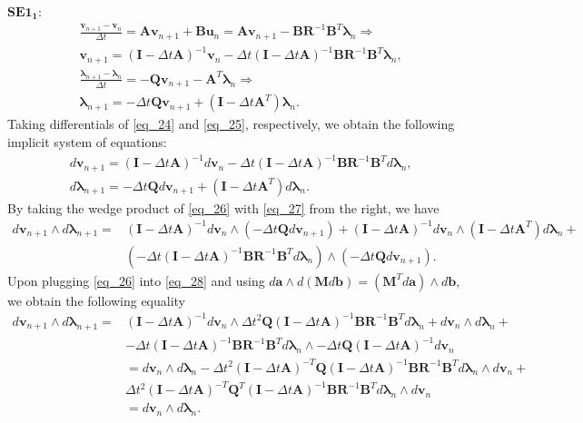 \documentclass[a4paper, 10pt]{article}
\newcommand{\SEoo}{SE1_1}
\begin{document}
$\bm{\SEoo:}$
\begin{align}
&   \frac{\bm{v}_{n+1} - \bm{v}_n}{\Delta{t}} = \bm{A}\bm{v}_{n+1} + \bm{B}\bm{u}_{n} =  \bm{A}\bm{v}_{n+1} - \bm{B}\bm{R}^{-1}\bm{B}^{T}\bm{\lambda}_{n} \Rightarrow \nonumber \\ &
    \bm{v}_{n+1} = (\bm{I} - \Delta{t}\bm{A})^{-1} \bm{v}_{n} - \Delta{t}(\bm{I} - \Delta{t}\bm{A})^{-1}\bm{B}\bm{R}^{-1}\bm{B}^{T}\bm{\lambda}_{n}, \label{eq_24} \\ &
       \frac{\bm{\lambda}_{n+1} - \bm{\lambda}_n}{\Delta{t}} = -\bm{Q}\bm{v}_{n+1} - \bm{A}^{T}\bm{\lambda}_{n} \Rightarrow \nonumber \\ &
       \bm{\lambda}_{n+1} = -\Delta{t}\bm{Q}\bm{v}_{n+1} +(\bm{I} - \Delta{t}\bm{A}^{T})\bm{\lambda}_{n}. \label{eq_25}
\end{align}
Taking differentials of \eqref{eq_24} and \eqref{eq_25}, respectively, we obtain the following implicit system of equations:
\begin{align}
    &  d\bm{v}_{n+1} = (\bm{I} - \Delta{t}\bm{A})^{-1} d\bm{v}_{n} - \Delta{t}(\bm{I} - \Delta{t}\bm{A})^{-1}\bm{B}\bm{R}^{-1}\bm{B}^{T}d\bm{\lambda}_{n}, \label{eq_26} \\
    & d\bm{\lambda}_{n+1} = -\Delta{t}\bm{Q}d\bm{v}_{n+1} +(\bm{I} - \Delta{t}\bm{A}^{T})d\bm{\lambda}_{n}. \label{eq_27}
\end{align}
By taking the wedge product of \eqref{eq_26} with \eqref{eq_27} from the right, we have
\begin{align}
       d\bm{v}_{n+1} \wedge   d\bm{\lambda}_{n+1}  = &  (\bm{I} - \Delta{t}\bm{A})^{-1} d\bm{v}_{n} \wedge  \left(-\Delta{t}\bm{Q}d\bm{v}_{n+1}\right) +   (\bm{I} - \Delta{t}\bm{A})^{-1} d\bm{v}_{n} \wedge (\bm{I} - \Delta{t}\bm{A}^{T})d\bm{\lambda}_{n}  +  \nonumber \\ &
          \left(-\Delta{t}(\bm{I} - \Delta{t}\bm{A})^{-1}\bm{B}\bm{R}^{-1}\bm{B}^{T}d\bm{\lambda}_{n}\right) \wedge \left(-\Delta{t}\bm{Q}d\bm{v}_{n+1} \right). \label{eq_28}
\end{align}
Upon plugging \eqref{eq_26} into \eqref{eq_28} and using $d\bm{a} \wedge d(\bm{M}d\bm{b}) = (\bm{M}^{T}d\bm{a}) \wedge d\bm{b}$, we obtain the following equality
\begin{align}
    d\bm{v}_{n+1} \wedge d\bm{\lambda}_{n+1} = &  (\bm{I} - \Delta{t}\bm{A})^{-1} d\bm{v}_{n} \wedge \Delta{t}^2\bm{Q}(\bm{I} - \Delta{t}\bm{A})^{-1}\bm{B}\bm{R}^{-1}\bm{B}^{T}d\bm{\lambda}_{n} + d\bm{v}_{n} \wedge d\bm{\lambda}_{n} + \nonumber \\
    & - \Delta{t}(\bm{I} - \Delta{t}\bm{A})^{-1}\bm{B}\bm{R}^{-1}\bm{B}^{T}d\bm{\lambda}_{n} \wedge -\Delta{t}\bm{Q}(\bm{I} - \Delta{t}\bm{A})^{-1} d\bm{v}_n   \nonumber \\
    & =  d\bm{v}_{n} \wedge d\bm{\lambda}_{n} - \Delta{t}^{2}(\bm{I}- \Delta{t}\bm{A})^{-T}\bm{Q}(\bm{I} - \Delta{t}\bm{A})^{-1}\bm{B}\bm{R}^{-1}\bm{B}^{T}d\bm{\lambda}_{n} \wedge d\bm{v}_n + \nonumber \\
    & \Delta{t}^{2}(\bm{I}- \Delta{t}\bm{A})^{-T}\bm{Q}^{T}(\bm{I} - \Delta{t}\bm{A})^{-1}\bm{B}\bm{R}^{-1}\bm{B}^{T}d\bm{\lambda}_{n} \wedge d\bm{v}_n  \nonumber \\
    & =  d\bm{v}_n \wedge d\bm{\lambda}_{n}.
\end{align}
\end{document}
